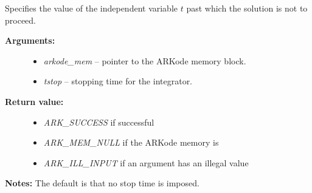 \documentclass[letterpaper,10pt,english]{sphinxmanual}
\begin{document}
\begin{fulllineitems}
\label{c_interface/User_callable:ARKodeSetStopTime}
Specifies the value of the independent variable
$t$ past which the solution is not to proceed.
\begin{description}
\item[{\textbf{Arguments:}}] \leavevmode\begin{itemize}
\item {} 
\emph{arkode\_mem} -- pointer to the ARKode memory block.

\item {} 
\emph{tstop} -- stopping time for the integrator.

\end{itemize}

\item[{\textbf{Return value:}}] \leavevmode\begin{itemize}
\item {} 
\emph{ARK\_SUCCESS} if successful

\item {} 
\emph{ARK\_MEM\_NULL} if the ARKode memory is 

\item {} 
\emph{ARK\_ILL\_INPUT} if an argument has an illegal value

\end{itemize}

\end{description}

\textbf{Notes:} The default is that no stop time is imposed.

\end{fulllineitems}

\end{document}
